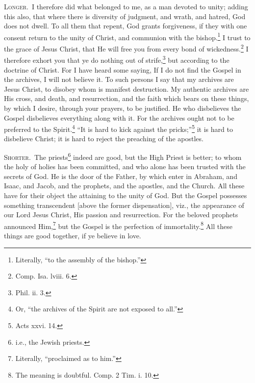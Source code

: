 \textsc{Longer.}~I therefore did what belonged to me, as a man devoted to unity; adding this also, that where there is diversity of judgment, and wrath, and hatred, God does not dwell. To all them that repent, God grants forgiveness, if they with one consent return to the unity of Christ, and communion with the bishop.\footnote{Literally, “to the assembly of the bishop.”} I trust to the grace of Jesus Christ, that He will free you from every bond of wickedness.\footnote{Comp. Isa. lviii. 6.} I therefore exhort you that ye do nothing out of strife,\footnote{Phil. ii. 3.} but according to the doctrine of Christ. For I have heard some saying, If I do not find the Gospel in the archives, I will not believe it. To such persons I say that my archives are Jesus Christ, to disobey whom is manifest destruction. My authentic archives are His cross, and death, and resurrection, and the faith which bears on these things, by which I desire, through your prayers, to be justified. He who disbelieves the Gospel disbelieves everything along with it. For the archives ought not to be preferred to the Spirit.\footnote{Or, “the archives of the Spirit are not exposed to all.”} “It is hard to kick against the pricks;”\footnote{Acts xxvi. 14.} it is hard to disbelieve Christ; it is hard to reject the preaching of the apostles.


\textsc{Shorter.}~The priests\footnote{i.e., the Jewish priests.} indeed are good, but the High Priest is better; to whom the holy of holies has been committed, and who alone has been trusted with the secrets of God. He is the door of the Father, by which enter in Abraham, and Isaac, and Jacob, and the prophets, and the apostles, and the Church. All these have for their object the attaining to the unity of God. But the Gospel possesses something transcendent [above the former dispensation], viz., the appearance of our Lord Jesus Christ, His passion and resurrection. For the beloved prophets announced Him,\footnote{Literally, “proclaimed as to him.”} but the Gospel is the perfection of immortality.\footnote{The meaning is doubtful. Comp. 2 Tim. i. 10.} All these things are good together, if ye believe in love.

